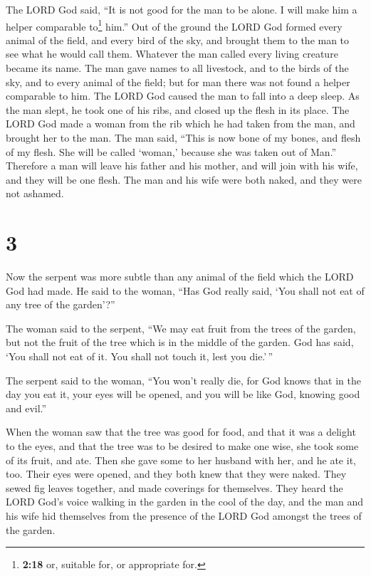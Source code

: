  The LORD God said, ``It is not good for the man to be
alone. I will make him a helper comparable to\footnote{\textbf{2:18} or,
  suitable for, or appropriate for.} him.''  Out of the
ground the LORD God formed every animal of the field, and every bird of
the sky, and brought them to the man to see what he would call them.
Whatever the man called every living creature became its name.
 The man gave names to all livestock, and to the birds of
the sky, and to every animal of the field; but for man there was not
found a helper comparable to him.  The LORD God caused
the man to fall into a deep sleep. As the man slept, he took one of his
ribs, and closed up the flesh in its place.  The LORD God
made a woman from the rib which he had taken from the man, and brought
her to the man.  The man said, ``This is now bone of my
bones, and flesh of my flesh. She will be called `woman,' because she
was taken out of Man.''  Therefore a man will leave his
father and his mother, and will join with his wife, and they will be one
flesh.  The man and his wife were both naked, and they
were not ashamed.

\hypertarget{section-2}{%
\section{3}\label{section-2}}

 Now the serpent was more subtle than any animal of the
field which the LORD God had made. He said to the woman, ``Has God
really said, `You shall not eat of any tree of the garden'?''

 The woman said to the serpent, ``We may eat fruit from
the trees of the garden,  but not the fruit of the tree
which is in the middle of the garden. God has said, `You shall not eat
of it. You shall not touch it, lest you die.'\,''

 The serpent said to the woman, ``You won't really die,
 for God knows that in the day you eat it, your eyes will
be opened, and you will be like God, knowing good and evil.''

 When the woman saw that the tree was good for food, and
that it was a delight to the eyes, and that the tree was to be desired
to make one wise, she took some of its fruit, and ate. Then she gave
some to her husband with her, and he ate it, too.  Their
eyes were opened, and they both knew that they were naked. They sewed
fig leaves together, and made coverings for themselves. 
They heard the LORD God's voice walking in the garden in the cool of the
day, and the man and his wife hid themselves from the presence of the
LORD God amongst the trees of the garden.

